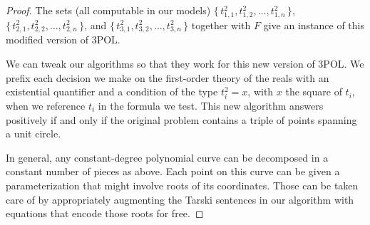 \begin{proof}
	The sets (all computable in our models)
	$\{\,t_{1,1}^2,t_{1,2}^2,\ldots,t_{1,n}^2\,\}$,
	$\{\,t_{2,1}^2,t_{2,2}^2,\ldots,t_{2,n}^2\,\}$, and
	$\{\,t_{3,1}^2,t_{3,2}^2,\ldots,t_{3,n}^2\,\}$
	together with $F$ give an instance of this modified version of 3POL\@.

	We can tweak our algorithms so that they work for this new version of
	3POL\@. We prefix each decision we make on the first-order theory of the reals
	with an existential quantifier and a condition of the type $t_i^2=x$, with
	$x$ the square of $t_i$, when we reference $t_i$ in the formula we test.
%
	This new algorithm answers positively if and only if the original problem
	contains a triple of points spanning a unit circle.

	In general, any constant-degree polynomial curve can be decomposed in
	a constant number of pieces as above. Each point on this curve can be given a
	parameterization that might involve roots of its coordinates. Those can be
	taken care of by appropriately augmenting the Tarski sentences in our
	algorithm with equations that encode those roots for free.
\end{proof}
